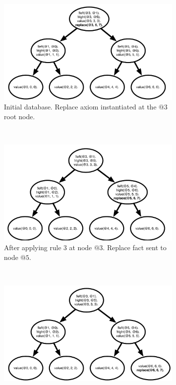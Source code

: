 \begin{figure}[h]
        \centering
        \begin{subfigure}[b]{0.5\textwidth}
                \includegraphics[width=\textwidth]{btree_trace1}
                \caption{Initial database. Replace axiom instantiated at the $@3$ root node.}
                \label{fig:btree_trace1}
        \end{subfigure}%
        ~
        \begin{subfigure}[b]{0.5\textwidth}
                \includegraphics[width=\textwidth]{btree_trace2}
                \caption{After applying rule 3 at node $@3$. Replace fact sent to node $@5$.}
                \label{fig:btree_trace2}
        \end{subfigure}\\
        \begin{subfigure}[b]{0.5\textwidth}
                \includegraphics[width=\textwidth]{btree_trace3}

\end{subfigure}
\end{figure}

